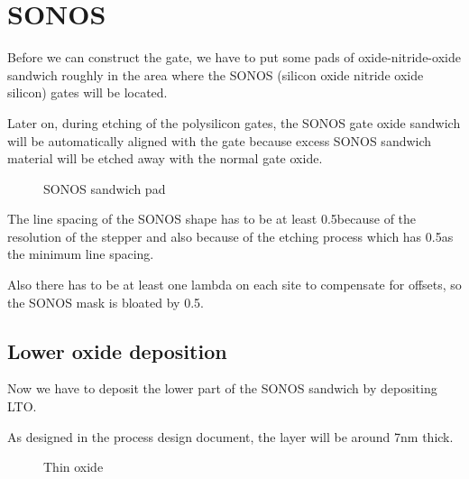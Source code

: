 \section{SONOS}\label{sonos_chapter}

Before we can construct the gate, we have to put some pads of oxide-nitride-oxide sandwich roughly in the area where the SONOS (silicon oxide nitride oxide silicon) gates will be located.

Later on, during etching of the polysilicon gates, the SONOS gate oxide sandwich will be automatically aligned with the gate because excess SONOS sandwich material will be etched away with the normal gate oxide.

\begin{figure}[H]
	\centering
	\begin{tikzpicture}[node distance = 3cm, auto, thick,scale=\CrossAndTopSectionBig, every node/.style={transform shape}]
		
	\end{tikzpicture}
	\caption{SONOS sandwich pad}
\end{figure}

The line spacing of the SONOS shape has to be at least 0.5\um because of the resolution of the stepper and also because of the etching process which has 0.5\um as the minimum line spacing.

Also there has to be at least one lambda on each site to compensate for offsets, so the SONOS mask is bloated by 0.5\um.

\newpage

\subsection{Lower oxide deposition}\label{step_depositing_sonos_lower_lto}

Now we have to deposit the lower part of the SONOS sandwich by depositing LTO.

As designed in the process design document, the layer will be around 7nm thick.

\begin{figure}[H]
	\centering
	\begin{tikzpicture}[node distance = 3cm, auto, thick,scale=\CrossSectionOnly, every node/.style={transform shape}]
		
	\end{tikzpicture}
	\begin{tikzpicture}[node distance = 3cm, auto, thick,scale=\CrossSectionOnly, every node/.style={transform shape}]
		
	\end{tikzpicture}
	\caption{Thin oxide}
\end{figure}

